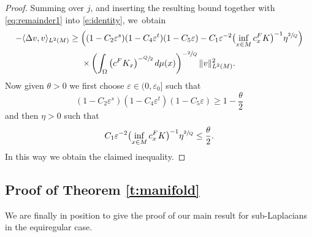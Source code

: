 \documentclass[11pt]{article}
\let\oldsfrac\sfrac
\renewcommand{\sfrac}[2]{{\oldsfrac{#1}{#2}}}
\newcommand{\FK}{\textup{FK}}
\theoremstyle{definition}
\let\epsilon\varepsilon
\newcommand{\1}{\mathbbm{1}}
\numberwithin{equation}{section}
\begin{document}
\begin{proof}
Summing over $j$, and inserting the resulting bound together with \eqref{eq:remainder1} into \eqref{e:identity}, we~obtain
\begin{multline*}
- \langle \Delta v, v \rangle_{L^2(M)}\geq \Bigl((1-C_2 \epsilon^s)(1-C_4 \epsilon^t) (1-C_5\epsilon) - C_1 \epsilon^{-2} \bigl(\inf_{x\in M} c_x^\FK \bigr)^{-1} \eta^{\sfrac2Q} \Bigr) \\
\times \left(\int_\Omega \left(c^\FK_x\right)^{-\sfrac Q2} d\mu(x)\right)^{-\sfrac 2Q} \| v \|_{L^2(M)}^2.
\end{multline*}
Now given $\theta>0$ we first choose $\epsilon\in(0,\epsilon_0]$ such that
\[
(1-C_2 \epsilon^s)(1-C_4 \epsilon^t) (1-C_5\epsilon) \geq 1- \frac{\theta}{2}
\]
and then $\eta>0$ such that
\[
C_1 \epsilon^{-2} \bigl(\inf_{x\in M} c_x^\FK \bigr)^{-1} \eta^{\sfrac2Q} \leq \frac{\theta}{2}.
\]
In this way we obtain the claimed inequality.
\end{proof}

\subsection{Proof of Theorem \ref{t:manifold}}
We are finally in position to give the proof of our main result for sub-Laplacians in the equiregular case.
\end{document}
